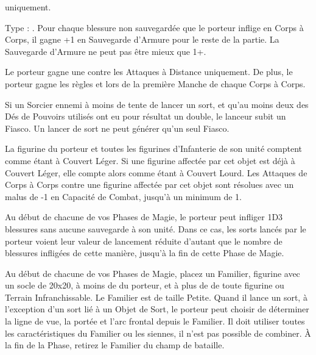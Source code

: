 \endpricelist

\armymagicalarmour

\startpricelist

\infantry{} uniquement.

Type : \ha{}. Pour chaque blessure non sauvegardée que le porteur inflige en Corps à Corps, il gagne +1 en Sauvegarde d'Armure pour le reste de la partie. La Sauvegarde d'Armure ne peut pas être mieux que 1+.

\endpricelist

\armytalismans

\startpricelist

Le porteur gagne une  contre les Attaques à Distance uniquement. De plus, le porteur gagne les règles  et  lors de la première Manche de chaque Corps à Corps.

Si un Sorcier ennemi à moins de  tente de lancer un sort, et qu'au moins deux des Dés de Pouvoirs utilisés ont eu pour résultat un double, le lanceur subit un Fiasco. Un lancer de sort ne peut générer qu'un seul Fiasco.

\endpricelist

\armyenchanteditems

\startpricelist

 La figurine du porteur et toutes les figurines d'Infanterie de son unité comptent comme étant à Couvert Léger. Si une figurine affectée par cet objet est déjà à Couvert Léger, elle compte alors comme étant à Couvert Lourd. Les Attaques de Corps à Corps contre une figurine affectée par cet objet sont résolues avec un malus de -1 en Capacité de Combat, jusqu'à un minimum de 1.

\endpricelist

\armyarcaneitems

\startpricelist

Au début de chacune de vos Phases de Magie, le porteur peut infliger 1D3 blessures sans aucune sauvegarde à son unité. Dans ce cas, les sorts lancés par le porteur voient leur valeur de lancement réduite d'autant que le nombre de blessures infligées de cette manière, jusqu'à la fin de cette Phase de Magie.

Au début de chacune de vos Phases de Magie, placez un Familier, figurine avec un socle de \unit{20x20}{\milli\meter}, à moins de  du porteur, et à plus de  de toute figurine ou Terrain Infranchissable. Le Familier est de taille Petite. Quand il lance un sort, à l'exception d'un sort lié à un Objet de Sort, le porteur peut choisir de déterminer la ligne de vue, la portée et l'arc frontal depuis le Familier. Il doit utiliser toutes les caractéristiques du Familier ou les siennes, il n'est pas possible de combiner. À la fin de la Phase, retirez le Familier du champ de bataille.

